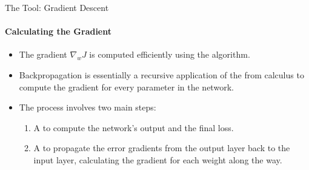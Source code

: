 \begin{frame}{The Tool: Gradient Descent}
    \framesubtitle{Calculating the Gradient}
    \begin{itemize}
        \item The gradient $\nabla_{w}J$ is computed efficiently using the  algorithm.
        \item Backpropagation is essentially a recursive application of the  from calculus to compute the gradient for every parameter in the network.
        \item The process involves two main steps:
        \begin{enumerate}
            \item A  to compute the network's output and the final loss.
            \item A  to propagate the error gradients from the output layer back to the input layer, calculating the gradient for each weight along the way.
        \end{enumerate}
    \end{itemize}
\end{frame}